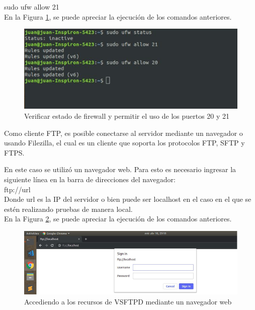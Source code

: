 \begin{enumerate}
    sudo ufw allow 21\\
    
    En la Figura \ref{fig:ftp4}, se puede apreciar la ejecución de los comandos anteriores.
    
    \begin{figure}[H]
        \centering
        \includegraphics[scale=1.05]{imagenes/primero/paso4_ftp.PNG}
        \caption{Verificar estado de firewall y permitir el uso de los puertos 20 y 21}
        \label{fig:ftp4}
    \end{figure}
\end{enumerate}

\noindent
Como cliente FTP, es posible conectarse al servidor mediante un navegador o usando Filezilla, el cual es un cliente que soporta los protocolos FTP, SFTP y FTPS.

\noindent
En este caso se utilizó un navegador web. Para esto es necesario ingresar la siguiente línea en la barra de direcciones del navegador:\\

\noindent
ftp://url\\

\noindent
Donde url es la IP del servidor o bien puede ser localhost en el caso en el que se estén realizando pruebas de manera local.\\

\noindent
En la Figura \ref{fig:ftp5}, se puede apreciar la ejecución de los comandos anteriores.
    
\begin{figure}[H]
    \centering
    \includegraphics[scale=.75]{imagenes/primero/cliente_ftp.PNG}
    \caption{Accediendo a los recursos de VSFTPD mediante un navegador web}
    \label{fig:ftp5}
\end{figure}

